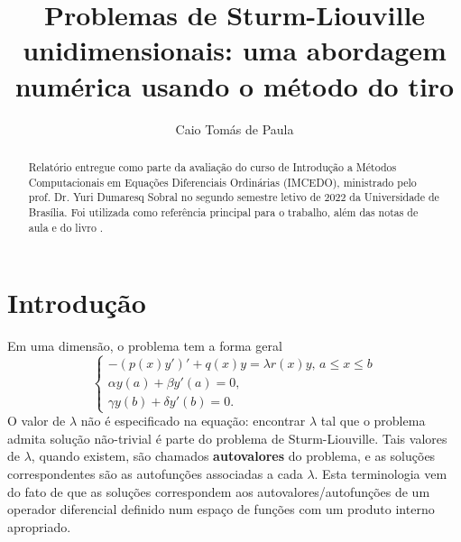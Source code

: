 \documentclass[twocolumn,showpacs,%
  nofootinbib,aps,superscriptaddress,%
  eqsecnum,prd,notitlepage,showkeys,10pt]{revtex4-1}
\renewcommand{\leq}{\leqslant}
\begin{document}
\title{
Problemas de Sturm-Liouville unidimensionais: 
uma abordagem numérica usando o método do tiro
}
\author{Caio Tomás de Paula}
%
\begin{abstract}
    Relatório entregue como parte da avaliação do curso de Introdução a
    Métodos Computacionais em Equações Diferenciais Ordinárias (IMCEDO),
    ministrado pelo prof. Dr. Yuri Dumaresq Sobral no segundo semestre letivo
    de 2022 da Universidade de Brasília. Foi utilizada 
    \cite{Sturm-Liouville} como referência principal para o trabalho, além
    das notas de aula \cite{notas-aula-IMCEDO} e do livro \cite{iserles2008}.
\end{abstract}
%
\maketitle
%
\section{Introdução}
%
Em uma dimensão, o problema tem a forma geral
%
\begin{equation}
\label{eq:forma-geral-SL-1D}
    \left\{
    \begin{array}{l}
        -(p(x)y')' + q(x)y = \lambda r(x)y, \, a \leq x \leq b \\
        \alpha y(a) + \beta y'(a) = 0, \\
        \gamma y(b) + \delta y'(b) = 0.
    \end{array}
    \right.
\end{equation}
%
O valor de $\lambda$ não é especificado na equação: encontrar $\lambda$
tal que o problema admita solução não-trivial é parte do problema de Sturm-Liouville.
Tais valores de $\lambda$, quando existem, são chamados \textbf{autovalores}
do problema, e as soluções correspondentes são as autofunções associadas
a cada $\lambda$. Esta terminologia vem do fato de que as soluções correspondem
aos autovalores/autofunções de um operador diferencial definido num espaço
de funções com um produto interno apropriado. 
\end{document}
